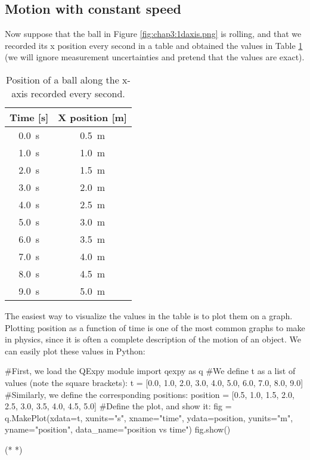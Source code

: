 \subsection{Motion with constant speed}
Now suppose that the ball in Figure \ref{fig:chap3:1daxis.png} is rolling, and that we recorded its x position every second in a table and obtained the values in Table \ref{tab:chap3:1dmotion} (we will ignore measurement uncertainties and pretend that the values are exact).
\begin{table}[!h]
\centering
\begingroup
\renewcommand{\arraystretch}{1.0}
\begin{tabular}{cc}
\textbf{Time [s]}&\textbf{X position [m]}\\
\hline
\hline
\SI{0.0}{s}& \SI{0.5}{m}\\ \hline
\SI{1.0}{s}& \SI{1.0}{m}\\ \hline
\SI{2.0}{s}& \SI{1.5}{m}\\ \hline
\SI{3.0}{s}& \SI{2.0}{m}\\ \hline
\SI{4.0}{s}& \SI{2.5}{m}\\ \hline
\SI{5.0}{s}& \SI{3.0}{m}\\ \hline
\SI{6.0}{s}& \SI{3.5}{m}\\ \hline
\SI{7.0}{s}& \SI{4.0}{m}\\ \hline
\SI{8.0}{s}& \SI{4.5}{m}\\ \hline
\SI{9.0}{s}& \SI{5.0}{m}\\ \hline
\end{tabular}
\caption{\label{tab:chap3:1dmotion} Position of a ball along the x-axis recorded every second.}
\endgroup
\end{table}
The easiest way to visualize the values in the table is to plot them on a graph. Plotting position as a function of time is one of the most common graphs to make in physics, since it is often a complete description of the motion of an object. We can easily plot these values in Python:
\begin{python}[caption=QExpy to calculate mean and standard deviation] 
#First, we load the QExpy module
import qexpy as q
#We define t as a list of values (note the square brackets):
t = [0.0, 1.0, 2.0, 3.0, 4.0, 5.0, 6.0, 7.0, 8.0, 9.0]
#Similarly, we define the corresponding positions:
position = [0.5, 1.0, 1.5, 2.0, 2.5, 3.0, 3.5, 4.0, 4.5, 5.0]
#Define the plot, and show it:
fig = q.MakePlot(xdata=t, xunits="s", xname="time",
                 ydata=position, yunits="m", yname="position",
                 data_name="position vs time")
fig.show()
\end{python}
\begin{poutput}
(*  *)
\end{poutput}

